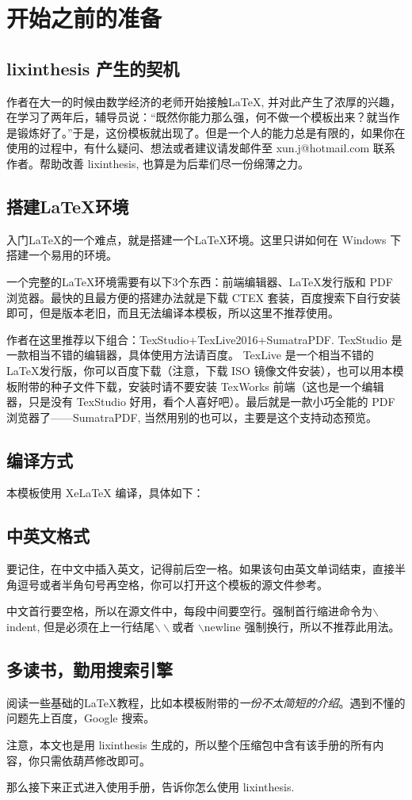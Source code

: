 \chapter{开始之前的准备}
\section{lixinthesis 产生的契机}
作者在大一的时候由数学经济的老师开始接触\LaTeX, 并对此产生了浓厚的兴趣，在学习了两年后，辅导员说：“既然你能力那么强，何不做一个模板出来？就当作是锻炼好了。”于是，这份模板就出现了。但是一个人的能力总是有限的，如果你在使用的过程中，有什么疑问、想法或者建议请发邮件至 {\sf xun.j@hotmail.com} 联系作者。帮助改善 lixinthesis, 也算是为后辈们尽一份绵薄之力。

\section{搭建\LaTeX 环境}
入门\LaTeX 的一个难点，就是搭建一个\LaTeX 环境。这里只讲如何在 Windows 下搭建一个易用的环境。

一个完整的\LaTeX 环境需要有以下3个东西：前端编辑器、\LaTeX 发行版和 PDF 浏览器。最快的且最方便的搭建办法就是下载 CTEX 套装，百度搜索下自行安装即可，但是版本老旧，而且无法编译本模板，所以这里不推荐使用。

作者在这里推荐以下组合：TexStudio+TexLive2016+SumatraPDF. TexStudio 是一款相当不错的编辑器，具体使用方法请百度。 TexLive 是一个相当不错的 \LaTeX 发行版，你可以百度下载（注意，下载 ISO 镜像文件安装），也可以用本模板附带的种子文件下载，安装时请不要安装 TexWorks 前端（这也是一个编辑器，只是没有 TexStudio 好用，看个人喜好吧）。最后就是一款小巧全能的 PDF 浏览器了——SumatraPDF, 当然用别的也可以，主要是这个支持动态预览。

\section{编译方式}
本模板使用 XeLaTeX 编译，具体如下：

\section{中英文格式}
要记住，在中文中插入英文，记得前后空一格。如果该句由英文单词结束，直接半角逗号或者半角句号再空格，你可以打开这个模板的源文件参考。

中文首行要空格，所以在源文件中，每段中间要空行。强制首行缩进命令为$\backslash$indent, 但是必须在上一行结尾$\backslash\backslash$或者 $\backslash$newline 强制换行，所以不推荐此用法。

\section{多读书，勤用搜索引擎}
阅读一些基础的\LaTeX 教程，比如本模板附带的\emph{一份不太简短的\LaTeXe 介绍}。遇到不懂的问题先上百度，Google 搜索。

注意，本文也是用 lixinthesis 生成的，所以整个压缩包中含有该手册的所有内容，你只需依葫芦修改即可。

那么接下来正式进入使用手册，告诉你怎么使用 lixinthesis. 